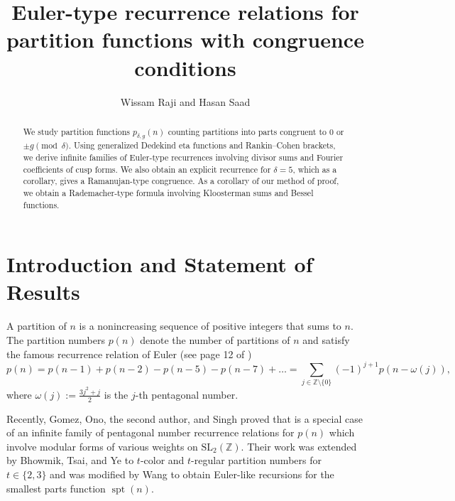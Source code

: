 \documentclass[10pt]{amsart}
\title[Euler-type recurrence relations for partition functions with congruence conditions]{Euler-type recurrence relations for partition functions with congruence conditions}
\author{Wissam Raji and Hasan Saad}
\theoremstyle{definition}
\theoremstyle{remark}
\numberwithin{equation}{section}
\DeclareMathOperator{\spt}{spt}
\newcommand{\SL}{\mathrm{SL}}
\newcommand{\Z}{\mathbb Z}
\begin{document}
	
	\begin{abstract}
    We study partition functions $p_{\delta,g}(n)$ counting partitions into parts congruent to $0$ or $\pm g \pmod\delta$. Using generalized Dedekind eta functions and Rankin–Cohen brackets, we derive infinite families of Euler-type recurrences involving divisor sums and Fourier coefficients of cusp forms. We also obtain an explicit recurrence for $\delta=5$, which as a corollary, gives a Ramanujan-type congruence. As a corollary of our method of proof, we obtain a Rademacher-type formula involving Kloosterman sums and Bessel functions.
    \end{abstract}
    \maketitle
	\section{Introduction and Statement of Results}
	
	A partition of $n$ is a nonincreasing sequence of positive integers that sums to $n.$ The partition numbers $p(n)$ denote the number of partitions of $n$ and satisfy the famous recurrence relation of Euler (see page 12 of \cite{Andrews})
	\begin{equation}\label{eq:EulerRecurrence}
	p(n)=p(n-1)+p(n-2)-p(n-5)-p(n-7)+\ldots=\sum\limits_{j\in\Z\setminus\{0\}}(-1)^{j+1}p(n-\omega(j)),
	\end{equation}
	where $\omega(j):=\frac{3j^2+j}{2}$ is the $j$-th pentagonal number.
	
	Recently, Gomez, Ono, the second author, and Singh proved \cite{Gomez} that  is a special case of an infinite family of pentagonal number recurrence relations for $p(n)$ which involve modular forms of various weights on $\SL_2(\Z).$ Their work was extended \cite{Bhowmik} by Bhowmik, Tsai, and Ye to $t$-color and $t$-regular partition numbers for $t\in\{2,3\}$ and was modified \cite{Wang} by Wang to obtain Euler-like recursions for the smallest parts function $\spt(n).$ 
	
\end{document}
